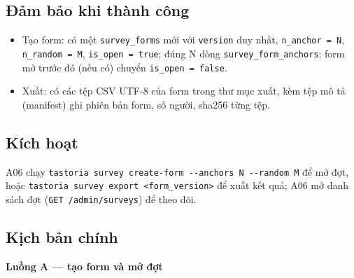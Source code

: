 \subsection{Đảm bảo khi thành công}
\begin{itemize}
\item Tạo form: có một {\small\texttt{survey\_\allowbreak{}\allowbreak{}forms}} mới với {\small\texttt{version}} duy nhất, {\small\texttt{n\_\allowbreak{}\allowbreak{}anchor = N}}, {\small\texttt{n\_\allowbreak{}\allowbreak{}random = M}}, {\small\texttt{is\_\allowbreak{}\allowbreak{}open = true}}; đúng N dòng {\small\texttt{survey\_\allowbreak{}\allowbreak{}form\_\allowbreak{}\allowbreak{}anchors}}; form mở trước đó (nếu có) chuyển {\small\texttt{is\_\allowbreak{}\allowbreak{}open = false}}.
\item Xuất: có các tệp CSV UTF-\allowbreak{}8 của form trong thư mục xuất, kèm tệp mô tả (manifest) ghi phiên bản form, số người, sha256 từng tệp.
\end{itemize}
\subsection{Kích hoạt}
A06 chạy {\small\texttt{tastoria survey create-\allowbreak{}form -\allowbreak{}-\allowbreak{}anchors N -\allowbreak{}-\allowbreak{}random M}} để mở đợt, hoặc {\small\texttt{tastoria survey export <form\_\allowbreak{}\allowbreak{}version>}} để xuất kết quả; A06 mở danh sách đợt ({\small\texttt{GET /\allowbreak{}\allowbreak{}admin/\allowbreak{}\allowbreak{}surveys}}) để theo dõi.

\subsection{Kịch bản chính}
\textbf{Luồng A --- tạo form và mở đợt}

